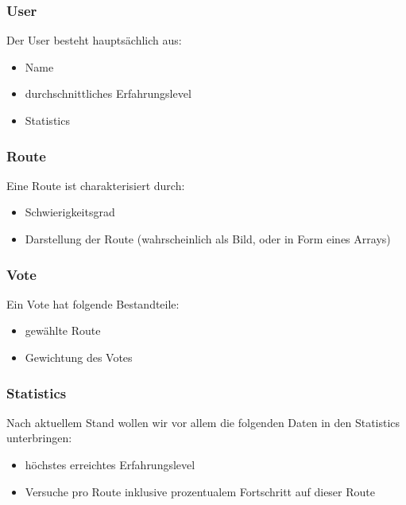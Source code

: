 \documentclass[11pt,a4paper,headsepline,footsepline,bibliography=totocnumbered]{article}
\begin{document}
    \subsubsection{User}
      \par
        Der User besteht hauptsächlich aus:
        \begin{itemize}
          \item Name
          \item durchschnittliches Erfahrungslevel
          \item Statistics
        \end{itemize}

    \subsubsection{Route}
      \par
        Eine Route ist charakterisiert durch:
        \begin{itemize}
          \item Schwierigkeitsgrad
          \item Darstellung der Route (wahrscheinlich als Bild, oder in Form eines Arrays)
        \end{itemize}

    \subsubsection{Vote}
      \par
        Ein Vote hat folgende Bestandteile:
        \begin{itemize}
          \item gewählte Route
          \item Gewichtung des Votes
        \end{itemize}

    \subsubsection{Statistics}
      \par
        Nach aktuellem Stand wollen wir vor allem die folgenden Daten in den Statistics unterbringen: 
        \begin{itemize}
          \item höchstes erreichtes Erfahrungslevel
          \item Versuche pro Route inklusive prozentualem Fortschritt auf dieser Route
        \end{itemize}
\end{document}

